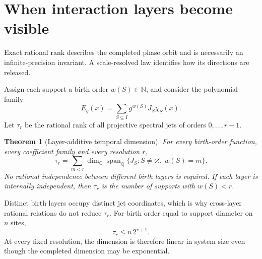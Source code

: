 \documentclass[10pt]{article}
\newtheorem{theorem}{Theorem}
\theoremstyle{definition}
\newcommand{\Q}{\mathbb Q}
\newcommand{\N}{\mathbb N}
\newcommand{\spanQ}{\operatorname{span}_{\Q}}
\begin{document}
\section{When interaction layers become visible}

Exact rational rank describes the completed phase orbit and is necessarily
an infinite-precision invariant. A scale-resolved law identifies how its
directions are released.

Assign each support a birth order \(w(S)\in\N\), and consider the polynomial
family
\begin{equation}
 E_g(x)=\sum_{S\subseteq I}g^{w(S)}J_S\chi_S(x).
 \label{eq:scaled}
\end{equation}
Let \(\tau_r\) be the rational rank of all projective spectral jets of
orders \(0,\ldots,r-1\).

\begin{theorem}[Layer-additive temporal dimension]
For every birth-order function, every coefficient family and every
resolution \(r\),
\begin{equation}
 \boxed{
 \tau_r=
 \sum_{m<r}
 \dim_{\Q}\spanQ
 \{J_S:S\ne\varnothing,\ w(S)=m\}.}
 \label{eq:layer}
\end{equation}
No rational independence between different birth layers is required. If
each layer is internally independent, then \(\tau_r\) is the number of
supports with \(w(S)<r\).
\end{theorem}

Distinct birth layers occupy distinct jet coordinates, which is why
cross-layer rational relations do not reduce \(\tau_r\). For birth order
equal to support diameter on \(n\) sites,
\begin{equation}
 \tau_r\le n\,2^{r+1}.
 \label{eq:layergeometry}
\end{equation}
At every fixed resolution, the dimension is therefore linear in system
size even though the completed dimension may be exponential.
\end{document}
